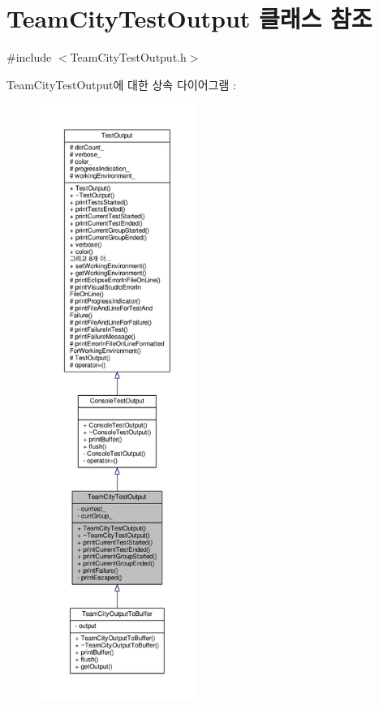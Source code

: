 \hypertarget{class_team_city_test_output}{}\section{Team\+City\+Test\+Output 클래스 참조}
\label{class_team_city_test_output}


{\ttfamily \#include $<$Team\+City\+Test\+Output.\+h$>$}



Team\+City\+Test\+Output에 대한 상속 다이어그램 \+: 
\nopagebreak
\begin{figure}[H]
\begin{center}
\leavevmode
\includegraphics[height=550pt]{class_team_city_test_output__inherit__graph}
\end{center}
\end{figure}



